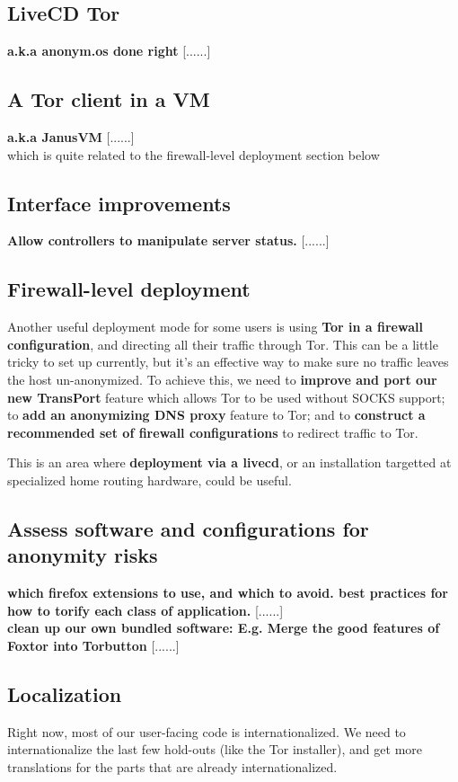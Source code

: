 \documentclass{article}
\newcommand{\tmp}[1]{{\bf #1} [......] \\}
\begin{document}
\subsection{LiveCD Tor}
\tmp{a.k.a anonym.os done right}

\subsection{A Tor client in a VM}
\tmp{a.k.a JanusVM} which is quite related to the firewall-level deployment
section below

\subsection{Interface improvements}
\tmp{Allow controllers to manipulate server status.}


\subsection{Firewall-level deployment}
Another useful deployment mode for some users is using {\bf Tor in a firewall
  configuration}, and directing all their traffic through Tor.  This can be a
little tricky to set up currently, but it's an effective way to make sure no
traffic leaves the host un-anonymized.  To achieve this, we need to {\bf
  improve and port our new TransPort} feature which allows Tor to be used
without SOCKS support; to {\bf add an anonymizing DNS proxy} feature to Tor;
and to {\bf construct a recommended set of firewall configurations} to redirect
traffic to Tor.

This is an area where {\bf deployment via a livecd}, or an installation
targetted at specialized home routing hardware, could be useful.

\subsection{Assess software and configurations for anonymity risks}

\tmp{which firefox extensions to use, and which to avoid. best practices for
how to torify each class of application.}

\tmp{clean up our own bundled software:
E.g. Merge the good features of Foxtor into Torbutton}

\subsection{Localization}
Right now, most of our user-facing code is internationalized.  We need to
internationalize the last few hold-outs (like the Tor installer), and get
more translations for the parts that are already internationalized.
\end{document}
